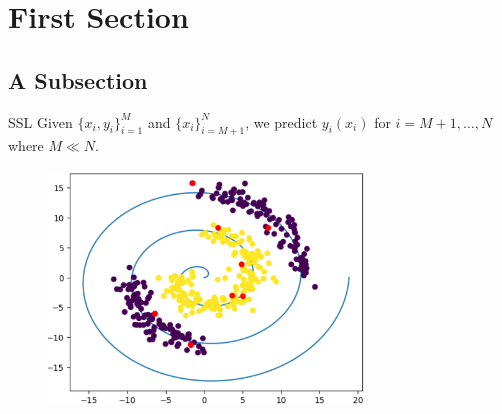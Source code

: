 \section{First Section}

\subsection{A Subsection}
	\begin{frame}{SSL}
		Given $\{x_i,y_i\}_{i=1}^{M}$ and $\{x_i\}_{i=M+1}^{N}$, we predict $y_i(x_i)$ for $i=M+1, \dots , N$ where $M \ll N$.
		\begin{figure}[H]
			\centering
			\hspace*{0cm}\includegraphics[width=0.75\textwidth,height=\textwidth,keepaspectratio]{Figures/SpiOg.png}
		\end{figure}
	\end{frame}

